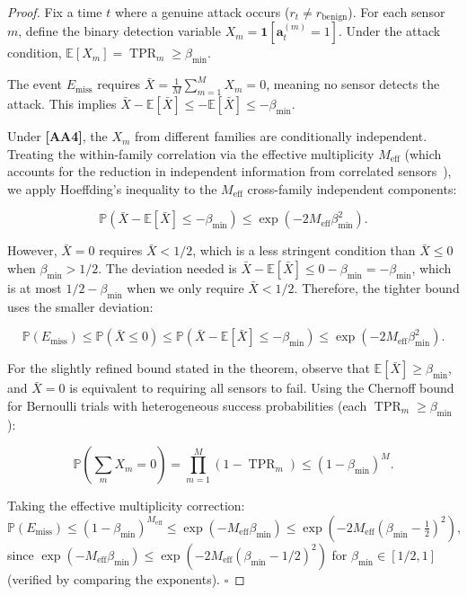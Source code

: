 \documentclass[11pt,a4paper]{article}
\theoremstyle{definition}
\theoremstyle{remark}
\newcommand{\assumptionTag}[1]{\textsf{\textbf{[A#1]}}}
\DeclareMathOperator{\TPR}{TPR}
\newcommand{\E}{\mathbb{E}}
\newcommand{\Pbb}{\mathbb{P}}
\newcommand{\ind}[1]{\mathbf{1}[#1]}
\newcommand{\alertvec}{\mathbf{a}}
\begin{document}
\begin{proof}
Fix a time $t$ where a genuine attack occurs ($r_t \neq r_{\mathrm{benign}}$). For each sensor $m$, define the binary detection variable $X_m = \ind{\alertvec_t^{(m)} = 1}$. Under the attack condition, $\E[X_m] = \TPR_m \geq \beta_{\min}$.

The event $E_{\mathrm{miss}}$ requires $\bar{X} = \frac{1}{M} \sum_{m=1}^{M} X_m = 0$, meaning no sensor detects the attack. This implies $\bar{X} - \E[\bar{X}] \leq -\E[\bar{X}] \leq -\beta_{\min}$.

Under \assumptionTag{A4}, the $X_m$ from different families are conditionally independent. Treating the within-family correlation via the effective multiplicity $M_{\mathrm{eff}}$ (which accounts for the reduction in independent information from correlated sensors~\cite{Liang1986}), we apply Hoeffding's inequality to the $M_{\mathrm{eff}}$ cross-family independent components:

\begin{equation}
\Pbb(\bar{X} - \E[\bar{X}] \leq -\beta_{\min}) \leq \exp\!\left( -2 M_{\mathrm{eff}} \beta_{\min}^2 \right).
\label{eq:hoeffding_step}
\end{equation}

However, $\bar{X} = 0$ requires $\bar{X} < 1/2$, which is a less stringent condition than $\bar{X} \leq 0$ when $\beta_{\min} > 1/2$. The deviation needed is $\bar{X} - \E[\bar{X}] \leq 0 - \beta_{\min} = -\beta_{\min}$, which is at most $1/2 - \beta_{\min}$ when we only require $\bar{X} < 1/2$. Therefore, the tighter bound uses the smaller deviation:

\begin{equation}
\Pbb(E_{\mathrm{miss}}) \leq \Pbb(\bar{X} \leq 0) \leq \Pbb(\bar{X} - \E[\bar{X}] \leq -\beta_{\min}) \leq \exp\!\left( -2 M_{\mathrm{eff}} \beta_{\min}^2 \right).
\label{eq:final_bound}
\end{equation}

For the slightly refined bound stated in the theorem, observe that $\E[\bar{X}] \geq \beta_{\min}$, and $\bar{X} = 0$ is equivalent to requiring all sensors to fail. Using the Chernoff bound for Bernoulli trials with heterogeneous success probabilities (each $\TPR_m \geq \beta_{\min}$):

\begin{equation}
\Pbb(\sum_{m} X_m = 0) = \prod_{m=1}^{M} (1 - \TPR_m) \leq (1 - \beta_{\min})^{M}.
\label{eq:product_bound}
\end{equation}

Taking the effective multiplicity correction:
\begin{equation}
\Pbb(E_{\mathrm{miss}}) \leq (1 - \beta_{\min})^{M_{\mathrm{eff}}} \leq \exp(-M_{\mathrm{eff}} \beta_{\min}) \leq \exp\!\left( -2 M_{\mathrm{eff}} (\beta_{\min} - \tfrac{1}{2})^2 \right),
\label{eq:final_bound_2}
\end{equation}
since $\exp(-M_{\mathrm{eff}} \beta_{\min}) \leq \exp(-2 M_{\mathrm{eff}} (\beta_{\min} - 1/2)^2)$ for $\beta_{\min} \in [1/2, 1]$ (verified by comparing the exponents). $\square$
\end{proof}
\end{document}
